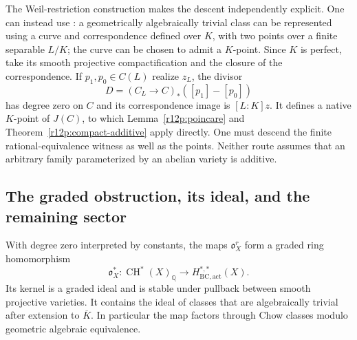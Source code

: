 \begin{remark}
The Weil-restriction construction makes the descent independently
explicit.  One can instead use
\cite[Theorem 2 and Lemma 4.14]{ACMV}: a geometrically algebraically
trivial class can be represented using a curve and correspondence
defined over $K$, with two points over a finite separable $L/K$;
the curve can be chosen to admit a $K$-point.  Since $K$ is perfect,
take its smooth projective compactification and the closure of the
correspondence.  If $p_1,p_0\in C(L)$ realize $z_L$, the divisor
\[
              D=(C_L\to C)_*([p_1]-[p_0])
\]
has degree zero on $C$ and its correspondence image is $[L:K]z$.
It defines a native $K$-point of $J(C)$, to which
Lemma~\ref{r12p:poincare} and Theorem~\ref{r12p:compact-additive}
apply directly.  One must descend the finite rational-equivalence
witness as well as the points.  Neither route assumes that an
arbitrary family parameterized by an abelian variety is additive.
\end{remark}

\subsection{The graded obstruction, its ideal, and the remaining sector}

\begin{proposition}
\label{r12p:ring}
With degree zero interpreted by constants, the maps
$\mathfrak o_X^r$ form a graded ring homomorphism
\[
 \mathfrak o_X^*: \operatorname{CH}^*(X)_{\mathbb Q}
       \longrightarrow H_{\mathrm{BC,act}}^{*,*}(X).
\tag{R12.P15}\label{r12p:ring-map}
\]
Its kernel is a graded ideal and is stable under pullback between
smooth projective varieties.  It contains the ideal of classes
that are algebraically trivial after extension to $\overline K$.
In particular the map factors through Chow classes modulo geometric
algebraic equivalence.
\end{proposition}

